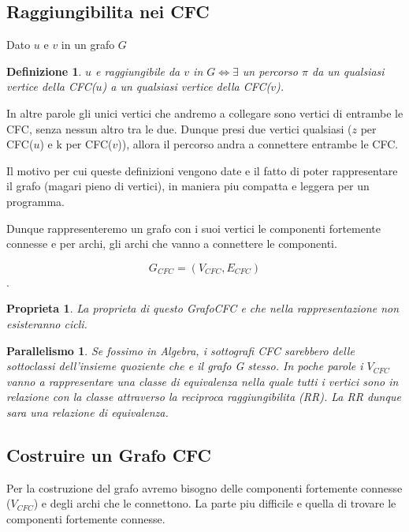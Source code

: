 \subsection{Raggiungibilita nei CFC}
\newtheorem{raggiungibilita}{Definizione}
Dato $u$ e $v$ in un grafo $G$
\begin{raggiungibilita}
	$u$ e raggiungibile da $v$ in $G \iff \exists$ un percorso $\pi$ da un qualsiasi vertice della CFC($u$) a un qualsiasi vertice della CFC($v$).
\end{raggiungibilita}
In altre parole gli unici vertici che andremo a collegare sono vertici di entrambe le CFC, senza nessun altro tra le due. Dunque presi due vertici qualsiasi ($z$ per CFC($u$) e k per CFC($v$)), allora il percorso andra a connettere entrambe le CFC.

Il motivo per cui queste definizioni vengono date e il fatto di poter rappresentare il grafo (magari pieno di vertici), in maniera piu compatta e leggera per un programma.

Dunque rappresenteremo un grafo con i suoi vertici le componenti fortemente connesse e per archi, gli archi che vanno a connettere le componenti.

$$G_{CFC} = (V_{CFC}, E_{CFC})$$.

\newtheorem{corollcfc}{Proprieta}
\begin{corollcfc}
	La proprieta di questo GrafoCFC e che nella rappresentazione non esisteranno cicli.
\end{corollcfc} 

\newtheorem{parallelCFC}{Parallelismo}

\begin{parallelCFC}
	Se fossimo in Algebra, i sottografi CFC sarebbero delle sottoclassi dell'insieme quoziente che e il grafo G stesso. In poche parole i $V_{CFC}$ vanno a rappresentare una classe di equivalenza nella quale tutti i vertici sono in relazione con la classe attraverso la reciproca raggiungibilita (RR).
	La RR dunque sara una relazione di equivalenza.
\end{parallelCFC}

\subsection{Costruire un Grafo CFC}
Per la costruzione del grafo avremo bisogno delle componenti fortemente connesse ($V_{CFC}$) e degli archi che le connettono. La parte piu difficile e quella di trovare le componenti fortemente connesse.

